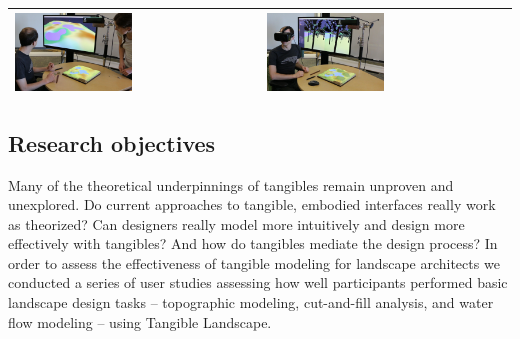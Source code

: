 \documentclass[Afour,sagev,times]{sagej} %
\newcommand{\ra}[1]{\renewcommand{\arraystretch}{#1}}
\begin{document}
\begin{table}
\begin{tabular}{m{} m{}}
%
\includegraphics[width=0.49\textwidth]{images/immersive/sculpting_landforms_3.png} &
\includegraphics[width=0.49\textwidth]{images/immersive/trees_with_oculus_1.png}\\
%
\bottomrule
\end{tabular}
\label{table:tl_demo} 
\end{table}


\subsection{Research objectives}
Many of the theoretical underpinnings of tangibles 
remain unproven and unexplored. 
Do current approaches to tangible, embodied interfaces
really work as theorized? 
Can designers really model more intuitively and 
design more effectively with tangibles?
And how do tangibles mediate the design process?
In order to assess the effectiveness 
of tangible modeling for landscape architects 
we conducted a series of user studies
assessing how well participants performed
basic landscape design tasks 
-- topographic modeling, cut-and-fill analysis, and water flow modeling --
using Tangible Landscape.\\
\end{document}
